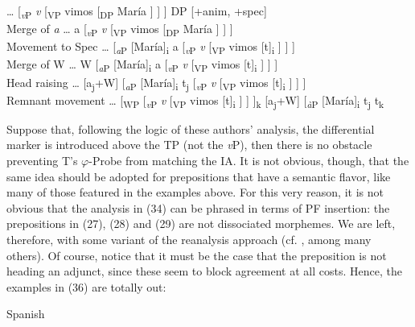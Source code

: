 \documentclass[output=paper]{langsci/langscibook}
\begin{document}
\ea
    \ea …  [\textit{\textsubscript{v}}\textsubscript{P}  \textit{v}  [\textsubscript{VP} vimos   [\textsubscript{DP} María ] ] ]    DP [+anim, +spec]\\
    Merge of \textit{a}
    \ex  …  a  [\textit{\textsubscript{v}}\textsubscript{P}  \textit{v}  [\textsubscript{VP} vimos   [\textsubscript{DP} María ] ] ]\\
    Movement to Spec 
    \ex  …  [\textit{\textsubscript{a}}\textsubscript{P} [María]\textsubscript{i}  a  [\textit{\textsubscript{v}}\textsubscript{P}  \textit{v}  [\textsubscript{VP} vimos [t]\textsubscript{i} ] ] ] \\
    Merge of W 
    \ex …  W [\textit{\textsubscript{a}}\textsubscript{P} [María]\textsubscript{i}  a  [\textit{\textsubscript{v}}\textsubscript{P}  \textit{v}  [\textsubscript{VP} vimos [t]\textsubscript{i} ] ] ]  \\
    Head raising 
    \ex …  [a\textsubscript{j}+W] [\textit{\textsubscript{a}}\textsubscript{P} [María]\textsubscript{i}  t\textsubscript{j}  [\textit{\textsubscript{v}}\textsubscript{P}  \textit{v}  [\textsubscript{VP} vimos [t]\textsubscript{i} ] ] ]  \\
    Remnant movement
    \ex …  [\textsubscript{WP}  [\textit{\textsubscript{v}}\textsubscript{P}  \textit{v}  [\textsubscript{VP} vimos [t]\textsubscript{i} ] ] ]\textsubscript{k} [a\textsubscript{j}+W] [\textit{\textsubscript{à}}\textsubscript{P} [María]\textsubscript{i}  t\textsubscript{j}  t\textsubscript{k}  
    \z
\z

Suppose that, following the logic of these authors’ analysis, the differential marker is introduced above the TP (not the \textit{v}P), then there is no obstacle preventing T’s $\varphi ${}-Probe from matching the IA. It is not obvious, though, that the same idea should be adopted for prepositions that have a semantic flavor, like many of those featured in the examples above. For this very reason, it is not obvious that the analysis in (34) can be phrased in terms of PF insertion: the prepositions in (27), (28) and (29) are not dissociated morphemes. We are left, therefore, with some variant of the reanalysis approach (cf. \citealt{Hornstein1981,Kayne1975,Kayne2004}, among many others). Of course, notice that it must be the case that the preposition is not heading an adjunct, since these seem to block agreement at all costs. Hence, the examples in (36) are totally out:



\ea%
    Spanish\label{ex:gallego:36}\\
    \z
\z    
\end{document}

